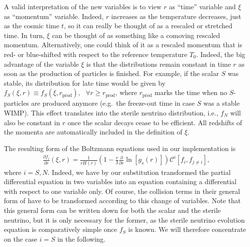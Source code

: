 A valid interpretation of the new variables is to view $r$ as ``time'' variable and $\xi$ as ``momentum'' variable. Indeed, $r$ increases as the temperature decreases, just as the cosmic time $t$, so it can really be thought of as a rescaled or stretched time. In turn, $\xi$ can be thought of as something like a comoving rescaled momentum. Alternatively, one could think of it as a rescaled momentum that is red- or blue-shifted with respect to the reference temperature $T_0$. Indeed, the big advantage of the variable $\xi$ is that the distributions remain constant in time $r$ as soon as the production of particles is finished. For example, if the scalar $S$ was stable, its distribution for late time would be given by $f_S(\xi,r) \equiv f_S(\xi, r_\text{prod}),~~~\forall r \geq r_\text{prod}$, where $r_\text{prod}$ marks the time when no $S$-particles are produced anymore (e.g.\ the freeze-out time in case $S$ was a stable WIMP). This effect translates into the sterile neutrino distribution, i.e., $f_N$ will also be constant in $r$ once the scalar decays cease to be efficient. All redshifts of the momenta are automatically included in the definition of $\xi$.

The resulting form of the Boltzmann equations used in our implementation is
\begin{align}
 \frac{\partial f_i}{\partial r}( \xi, r ) = \frac{1}{r H(r)} \left( 1 - \frac{r }{3} \frac{\partial}{\partial r} \ln [g_s(r)] \right) \mathcal{C}^i[f_i,f_{j\neq i}],
 \label{eq:boltz}
\end{align}
where $i=S,N$. Indeed, we have by our substitution transformed the partial differential equation in two variables into an equation containing a differential with respect to one variable only. Of course, the collision terms in their general form of  have to be transformed according to this change of variables. Note that this general form can be written down for both the scalar and the sterile neutrino, but it is only necessary for the former, as the sterile neutrino evolution equation is comparatively simple once $f_S$ is known. We will therefore concentrate on the case $i=S$ in the following.

